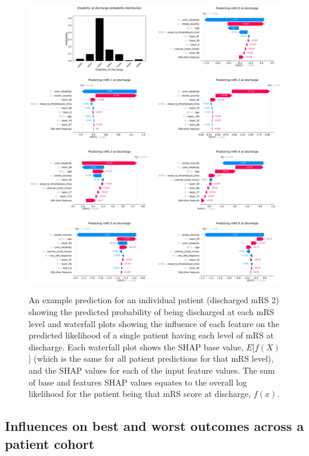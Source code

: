 \begin{figure}[!h]
  \centering   
 {\includegraphics[width=1\linewidth]
{./images/042_xgb_7_features_5fold_probability_distribution_with_individual_waterfall_plots.jpg}}
  \caption{An example prediction for an individual patient (discharged mRS 2) showing the predicted probability of being discharged at each mRS level and waterfall plots showing the influence of each feature on the predicted likelihood of a single patient having each level of mRS at discharge. Each waterfall plot shows the SHAP base value, $E[f(X)$] (which is the same for all patient predictions for that mRS level), and the SHAP values for each of the input feature values. The sum of base and features SHAP values equates to the overall log likelihood for the patient being that mRS score at discharge, $f(x)$.}
  \label{fig:results_waterfall}
\end{figure}


\subsection{Influences on best and worst outcomes across a patient cohort}

